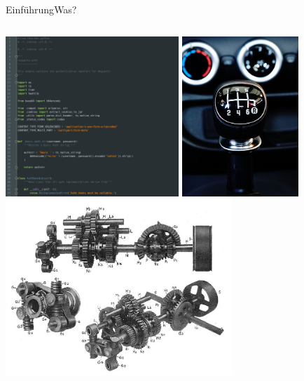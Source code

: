 \documentclass[t,aspectratio=169,divpsnames]{beamer}
\begin{document}
\begin{frame}{Einführung}{Was?}
\begin{columns}
\begin{column}{0.5\textwidth}
{				\includegraphics[width=0.49\textwidth]{img/SourceCode.png}
			}
			\only<4>
			{
				\center
				\includegraphics[width=0.33\textwidth]{img/GearShift.jpg}
				\includegraphics[width=0.64\textwidth]{img/GearShiftTechnical.jpg}
			}
		\end{column}
	\end{columns}
\end{frame}
\end{document}

